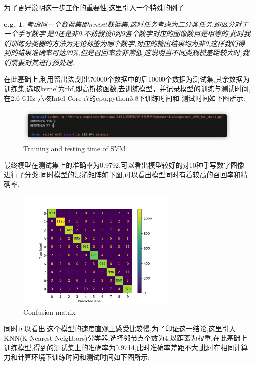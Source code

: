 \documentclass[UTF8,a4paper,11pt]{ctexart}
\newtheorem{ex}{e.g.}
\begin{document}
为了更好说明这一步工作的重要性,这里引入一个特殊的例子:
\begin{ex}
	考虑同一个数据集即mnisit数据集,这时任务考虑为二分类任务,即区分对于一个手写数字,是0还是非0.不妨假设0到9各个数字对应的图像数目是相等的,此时我们训练分类器的方法为无论标签为哪个数字,对应的输出结果均为非0,这样我们得到的结果准确率可达90\%,但是召回率会非常低,这说明当不同类规模差距较大时,我们需要对其进行预处理.
\end{ex}
\par 在此基础上,利用留出法,划出70000个数据中的后10000个数据为测试集,其余数据为训练集,选取kernel为rbf,即高斯核函数,去训练模型，并记录模型的训练与测试时间,在2.6 GHz 六核Intel Core i7的cpu,python3.8下训练时间和 测试时间如下图所示:
\begin{figure}[H]
	\centering
	\includegraphics[width=1.0\textwidth,height=0.2\textwidth]{time.png}
	\caption{Training and testing time of SVM}
\end{figure}
\par 最终模型在测试集上的准确率为0.9792,可以看出模型较好的对10种手写数字图像进行了分类.同时模型的混淆矩阵如下图,可以看出模型同时有着较高的召回率和精确率.
\begin{figure}[H]
	\centering
	\includegraphics[width=0.7\textwidth,height=0.5\textwidth]{cm.png}
	\caption{Confusion matrix}
\end{figure}
\par 同时可以看出,这个模型的速度直观上感受比较慢,为了印证这一结论,这里引入KNN(K-Nearest-Neighbors)分类器,选择邻节点个数为4,以距离为权重,在此基础上训练模型,得到的测试集上的准确率为0.9714,此时准确率差距不大,此时在相同计算力和计算环境下训练时间和测试时间如下图所示:
\end{document}
